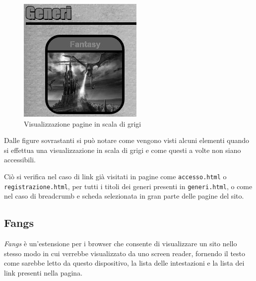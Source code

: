 \begin{figure}[H]
\begin{minipage}{0.45\textwidth}
\end{minipage}
\hspace{\fill}
\begin{minipage}{0.45\textwidth}
\includegraphics[width=\linewidth]{images/bn_h2etitoli.jpg}
\end{minipage}
\caption{Visualizzazione pagine in scala di grigi}\label{multiavp}
\end{figure}

Dalle figure sovrastanti si può notare come vengono visti alcuni elementi
quando si effettua una visualizzazione in scala di grigi e come questi a
volte non siano accessibili.

Ciò si verifica nel caso di link già visitati in pagine come
\texttt{accesso.html} o \texttt{registrazione.html}, per tutti i titoli dei
generi presenti in \texttt{generi.html}, o come nel caso di breadcrumb e scheda
selezionata in gran parte delle pagine del sito.

\subsection{Fangs}\label{sec:fangs} %
\textit{Fangs} è un'estensione per i browser che consente di visualizzare un
sito nello stesso modo in cui verrebbe visualizzato da uno screen reader,
fornendo il testo come sarebbe letto da questo dispositivo, la lista delle
intestazioni e la lista dei link presenti nella pagina.

